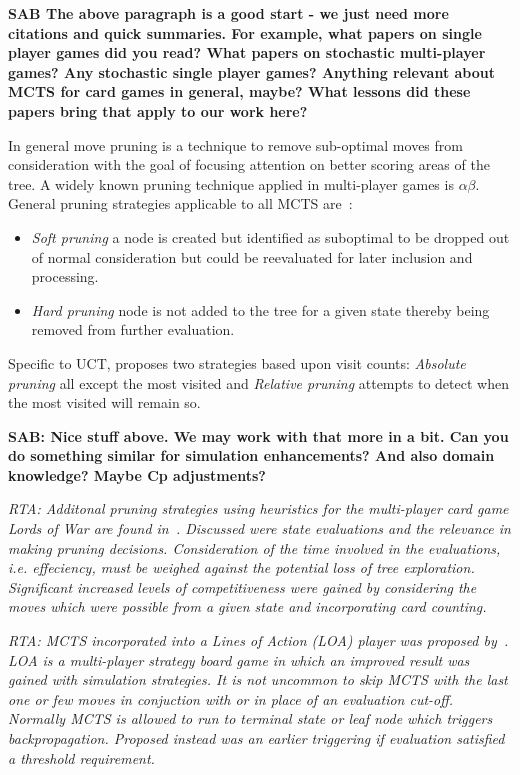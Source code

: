 \documentclass[letterpaper]{article}
\begin{document}
{\bf SAB The above paragraph is a good start - we just need more citations and quick summaries. For example, what papers on single player games did you read? What papers on stochastic multi-player games? Any stochastic single player games? Anything relevant about MCTS for card games in general, maybe? What lessons did these papers bring that apply to our work here?}

In general move pruning is a technique to remove sub-optimal moves from consideration with the goal of focusing attention on better scoring areas of the tree. A widely known pruning technique applied in multi-player games is $\alpha\beta$. General pruning strategies applicable to all MCTS are~\cite{browne2010monte}:
\begin{itemize}
\item \emph{Soft pruning} a node is created but identified as suboptimal to be dropped out of normal consideration but could be reevaluated for later inclusion and processing.
\item \emph{Hard pruning} node is not added to the tree for a given state thereby being removed from further evaluation.
\end{itemize}
Specific to UCT, \cite{huang2010pruning} proposes two strategies based upon visit counts: \emph{Absolute pruning} all except the most visited and \emph{Relative pruning} attempts to detect when the most visited will remain so.

{\bf SAB: Nice stuff above. We may work with that more in a bit. Can you do something similar for simulation enhancements? And also domain knowledge? Maybe Cp adjustments?}

\textit{RTA: Additonal pruning strategies using heuristics for the multi-player card game Lords of War are found  in~\cite{sephton2014ieee}. Discussed were state evaluations and the relevance in making pruning decisions. Consideration of the time involved in the evaluations, i.e. effeciency, must be weighed against the potential loss of tree exploration. Significant increased levels of competitiveness were gained by considering the moves which were possible from a given state and incorporating card counting.}

\textit{RTA: MCTS incorporated into a Lines of Action (LOA) player was proposed by~\cite{winands2010monte}. LOA is a multi-player strategy board game in which an improved result was gained with simulation strategies. It is not uncommon to skip MCTS with the last one or few moves in conjuction with or in place of an evaluation cut-off. Normally MCTS is allowed to run to terminal state or leaf node which triggers backpropagation. Proposed instead was an earlier triggering if evaluation satisfied a threshold requirement.}
\end{document}
